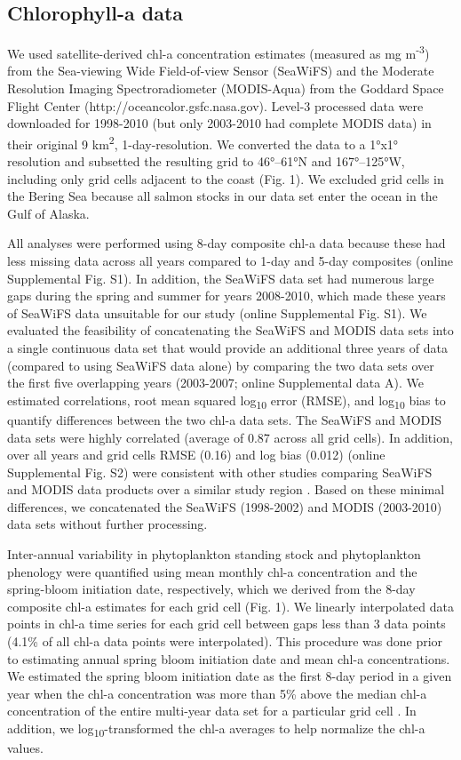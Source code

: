 \subsection{Chlorophyll-a data}

We used satellite-derived chl-a concentration estimates (measured as mg
m\textsuperscript{-3}) from the Sea-viewing Wide Field-of-view Sensor (SeaWiFS)
and the Moderate Resolution Imaging Spectroradiometer (MODIS-Aqua) from the
Goddard Space Flight Center (http://oceancolor.gsfc.nasa.gov). Level-3 processed
data were downloaded for 1998-2010 (but only 2003-2010 had complete MODIS data)
in their original 9 km\textsuperscript{2}, 1-day-resolution. We converted the
data to a 1°x1° resolution and subsetted the resulting grid to 46°--61°N and
167°--125°W, including only grid cells adjacent to the coast (Fig. 1). We
excluded grid cells in the Bering Sea because all salmon stocks in our data set
enter the ocean in the Gulf of Alaska.

All analyses were performed using 8-day composite chl-a data because these had
less missing data across all years compared to 1-day and 5-day composites
(online Supplemental Fig. S1). In addition, the SeaWiFS data set had numerous
large gaps during the spring and summer for years 2008-2010, which made these
years of SeaWiFS data unsuitable for our study (online Supplemental Fig. S1). We
evaluated the feasibility of concatenating the SeaWiFS and MODIS data sets into
a single continuous data set that would provide an additional three years of
data (compared to using SeaWiFS data alone) by comparing the two data sets over
the first five overlapping years (2003-2007; online Supplemental data A). We
estimated correlations, root mean squared log\textsubscript{10} error (RMSE),
and log\textsubscript{10} bias to quantify differences between the two chl-a
data sets. The SeaWiFS and MODIS data sets were highly correlated (average of
0.87 across all grid cells). In addition, over all years and grid cells RMSE
(0.16) and log bias (0.012) (online Supplemental Fig. S2) were consistent with
other studies comparing SeaWiFS and MODIS data products over a similar study
region \citep{Waite2013}. Based on these minimal differences, we concatenated
the SeaWiFS (1998-2002) and MODIS (2003-2010) data sets without further
processing.

Inter-annual variability in phytoplankton standing stock and phytoplankton
phenology were quantified using mean monthly chl-a concentration and the
spring-bloom initiation date, respectively, which we derived from the 8-day
composite chl-a estimates for each grid cell (Fig. 1). We linearly interpolated
data points in chl-a time series for each grid cell between gaps less than 3
data points (4.1\% of all chl-a data points were interpolated). This procedure
was done prior to estimating annual spring bloom initiation date and mean chl-a
concentrations. We estimated the spring bloom initiation date as the first 8-day
period in a given year when the chl-a concentration was more than 5\% above the
median chl-a concentration of the entire multi-year data set for a particular
grid cell \citep{Siegel2002a, Henson2007a}. In addition, we
log\textsubscript{10}-transformed the chl-a averages to help normalize the chl-a
values.


